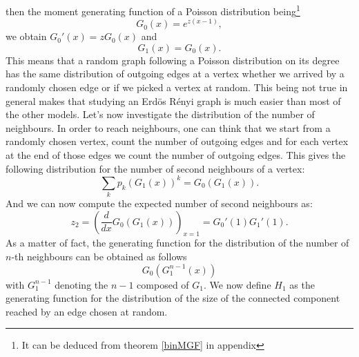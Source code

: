 then the moment generating function of a Poisson distribution being\footnote{It can be deduced from theorem \ref{binMGF} in appendix}
\begin{equation}
	G_0(x) = e^{z(x-1)},
\end{equation}
we obtain $G_0'(x) = zG_0(x)$ and
\begin{equation}\label{eq:PoiGen}
	G_1(x) = G_0(x).
\end{equation}
This means that a random graph following a Poisson distribution on its degree has the same distribution of outgoing edges at a vertex whether we arrived by a randomly chosen edge or if we picked a vertex at random.
This being not true in general makes that studying an Erd\"os R\'enyi graph is much easier than most of the other models.
\newline
Let's now investigate the distribution of the number of neighbours.
In order to reach neighbours, one can think that we start from a randomly chosen vertex, count the number of outgoing edges and for each vertex at the end of those edges we count the number of outgoing edges.
This gives the following distribution for the number of second neighbours of a vertex:
\begin{equation}
	\sum_k p_k(G_1(x))^k = G_0(G_1(x)).
\end{equation}
And we can now compute the expected number of second neighbours as:
\begin{equation}
	z_2 = (\frac{d}{dx} G_0(G_1(x)))_{x=1} = G_0'(1)G_1'(1).
\end{equation}
As a matter of fact, the generating function for the distribution of the number of $n$-th neighbours can be obtained as follows
\begin{equation}
	G_0(G_1^{n-1}(x))
\end{equation}
with $G_1^{n-1}$ denoting the $n-1$ composed of $G_1$.
\newline
We now define $H_1$ as the generating function for the distribution of the size of the connected component reached by an edge chosen at random.
